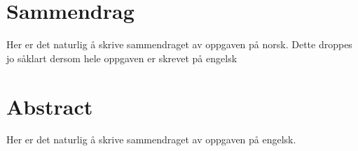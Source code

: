 \newpage
\chapter*{\centering Sammendrag}
Her er det naturlig å skrive sammendraget av oppgaven på norsk. Dette droppes jo såklart dersom hele oppgaven er skrevet på engelsk

\kant[2]


\newpage
\chapter*{\centering Abstract}
Her er det naturlig å skrive sammendraget av oppgaven på engelsk.

\kant[3]








